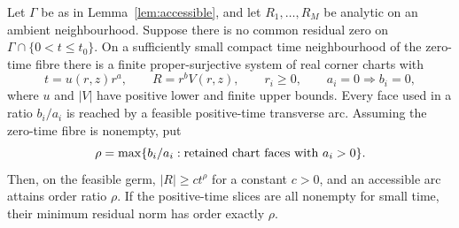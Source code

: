 \begin{theorem}\label{thm:real}
Let $\Gamma$ be as in Lemma~\ref{lem:accessible}, and let $R_1,\ldots,R_M$ be analytic on an ambient neighbourhood. Suppose there is no common residual zero on $\Gamma\cap\{0<t\le t_0\}$. On a sufficiently small compact time neighbourhood of the zero-time fibre there is a finite proper-surjective system of real corner charts with
\begin{equation}\label{eq:real-monomials}
 t=u(r,z)r^a,\qquad R=r^bV(r,z),\qquad r_i\ge0,\qquad
a_i=0\Longrightarrow b_i=0,
\end{equation}
where $u$ and $|V|$ have positive lower and finite upper bounds. Every face used in a ratio $b_i/a_i$ is reached by a feasible positive-time transverse arc. Assuming the zero-time fibre is nonempty, put
\[
 \rho=\max\{b_i/a_i:\hbox{retained chart faces with }a_i>0\}.
\]
Then, on the feasible germ, $|R|\ge c t^\rho$ for a constant $c>0$, and an accessible arc attains order ratio $\rho$. If the positive-time slices are all nonempty for small time, their minimum residual norm has order exactly $\rho$.
\end{theorem}
